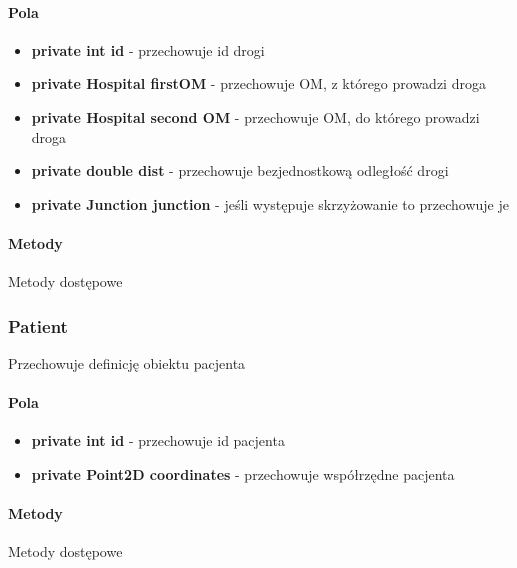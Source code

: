 \documentclass[]{article}
\begin{document}
                \paragraph{Pola}
                    \begin{itemize}
                        \item \textbf{private int id} - przechowuje id drogi
                        \item \textbf{private Hospital firstOM} - przechowuje OM, z którego prowadzi droga
                        \item \textbf{private Hospital second OM} - przechowuje OM, do którego prowadzi droga
                        \item \textbf{private double dist} - przechowuje bezjednostkową odległość drogi 
                        \item \textbf{private Junction junction} - jeśli występuje skrzyżowanie to przechowuje je
                    \end{itemize}
            
                \paragraph{Metody}
                    Metody dostępowe
                    
            \subsubsection{Patient}
                    Przechowuje definicję obiektu pacjenta
                \paragraph{Pola}
                    \begin{itemize}
                        \item \textbf{private int id} - przechowuje id pacjenta
                        \item \textbf{private Point2D coordinates} - przechowuje współrzędne pacjenta
                    \end{itemize}
            
                \paragraph{Metody}
                    Metody dostępowe
                    
\end{document}
